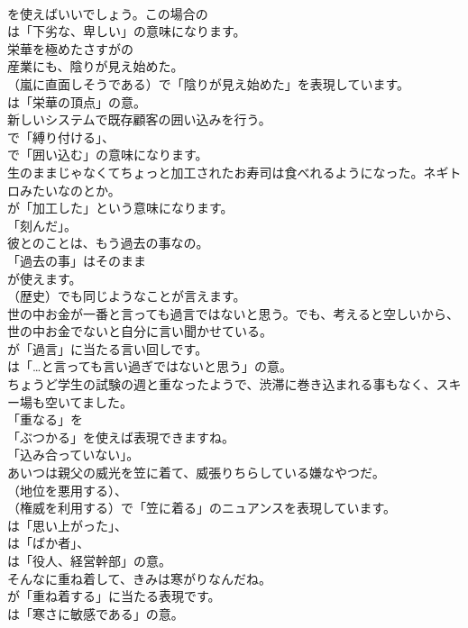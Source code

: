 \documentclass[8pt]{extreport}
\begin{document}
\begin{CJK}{UTF8}{min}
\\	を使えばいいでしょう。この場合の
\\	は「下劣な、卑しい」の意味になります。	
\\	栄華を極めたさすがの
\\	産業にも、陰りが見え始めた。 
\\	（嵐に直面しそうである）で「陰りが見え始めた」を表現しています。
\\	は「栄華の頂点」の意。	
\\	新しいシステムで既存顧客の囲い込みを行う。 
\\	で「縛り付ける」、
\\	で「囲い込む」の意味になります。	
\\	生のままじゃなくてちょっと加工されたお寿司は食べれるようになった。ネギトロみたいなのとか。 
\\	が「加工した」という意味になります。
\\	「刻んだ」。	
\\	彼とのことは、もう過去の事なの。 
\\	「過去の事」はそのまま
\\	が使えます。
\\	（歴史）でも同じようなことが言えます。	
\\	世の中お金が一番と言っても過言ではないと思う。でも、考えると空しいから、世の中お金でないと自分に言い聞かせている。 
\\	が「過言」に当たる言い回しです。
\\	は「…と言っても言い過ぎではないと思う」の意。	
\\	ちょうど学生の試験の週と重なったようで、渋滞に巻き込まれる事もなく、スキー場も空いてました。 
\\	「重なる」を
\\	「ぶつかる」を使えば表現できますね。
\\	「込み合っていない」。	
\\	あいつは親父の威光を笠に着て、威張りちらしている嫌なやつだ｡ 
\\	（地位を悪用する）、
\\	（権威を利用する）で「笠に着る」のニュアンスを表現しています。
\\	は「思い上がった」、
\\	は「ばか者」、
\\	は「役人、経営幹部」の意。	
\\	そんなに重ね着して、きみは寒がりなんだね。 
\\	が「重ね着する」に当たる表現です。
\\	は「寒さに敏感である」の意。	

\end{CJK}
\end{document}
